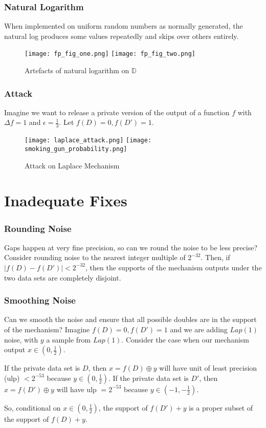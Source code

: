 \documentclass{beamer}
\begin{document}
\begin{frame}
    \frametitle{Natural Logarithm}
    When implemented on uniform random numbers as normally generated, the natural log produces some values repeatedly and skips over others entirely. \cite{Mir2012} 
    \begin{figure}        
        \texttt{[image: fp\_fig\_one.png]}
        \hfill
        \texttt{[image: fp\_fig\_two.png]}
        \caption{Artefacts of natural logarithm on $\mathbb{D}$ \cite{Mir2012}}
    \end{figure}
\end{frame}

\begin{frame}
    \frametitle{Attack}
    Imagine we want to release a private version of the output of a function $f$ with $\Delta f = 1$ and $\epsilon = \frac{1}{3}$. 
    Let $f(D) = 0, f(D') = 1$. 
    \begin{figure}
        \texttt{[image: laplace\_attack.png]}
        \hfill
        \texttt{[image: smoking\_gun\_probability.png]}
        \caption{Attack on Laplace Mechanism \cite{Mir2012}}
    \end{figure} 
\end{frame}

\section{Inadequate Fixes}
\begin{frame}
    \frametitle{Rounding Noise}
    Gaps happen at very fine precision, so can we round the noise to be less precise? Consider rounding noise to the nearest integer multiple of $2^{-32}$. 
    Then, if $\vert f(D) - f(D') \vert < 2^{-32}$, then the supports of the mechanism outputs under the two data sets are completely disjoint.
\end{frame}

\begin{frame}
    \frametitle{Smoothing Noise}
    Can we smooth the noise and ensure that all possible doubles are in the support of the mechanism? Imagine $f(D) = 0, f(D') = 1$ and we are adding $Lap(1)$ noise, with $y$ a sample from $Lap(1)$. Consider the case when our mechanism output $x \in (0, \frac{1}{2})$. \newline

    If the private data set is $D$, then $x = f(D) \oplus y$ will have unit of least precision (ulp) $< 2^{-53}$ because $y \in (0, \frac{1}{2})$. 
    If the private data set is $D'$, then $x = f(D') \oplus y$ will have ulp $= 2^{-53}$ because $y \in (-1, -\frac{1}{2})$. \newline

    So, conditional on $x \in (0, \frac{1}{2})$, the support of $f(D') + y$ is a proper subset of the support of $f(D) + y$. \newline
\end{frame}
\end{document}

